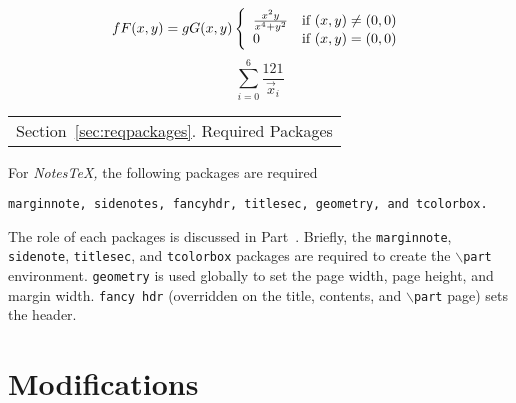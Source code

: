 \documentclass[10pt]{article}
\begin{document}
\[
f F (x,y)= gG(x,y) \left\{ \begin{array}{ll}
\frac{x^2y}{x^4+y^2} & \mbox{if $(x,y) \neq (0,0)$} \\
0 & \mbox{if $(x,y) = (0,0)$} \\
\end{array}
\right. \\
\]
\begin{equation}
\sum^{6}_{i=0}\frac{121}{\vec{x}_i}
\end{equation}

\begin{margintable}\vspace{.8in}\footnotesize
		\begin{tabularx}{\marginparwidth}{|X}
		Section~\ref{sec:reqpackages}. Required Packages\\
		\end{tabularx}
	\end{margintable}
	For \textit{NotesTeX,}  the following  packages are required
	\begin{center}
		\texttt{marginnote, sidenotes, fancyhdr, titlesec, geometry, and tcolorbox.}
	\end{center}
	The role of each packages is discussed in Part~\ref{Part:Modification}. Briefly, the \texttt{marginnote}, \texttt{sidenote}, \texttt{titlesec}, and \texttt{tcolorbox} packages are required to create the \texttt{$\backslash$part} environment. \texttt{geometry} is used globally to set the page width, page height, and margin width. \texttt{fancy\ hdr} (overridden on the title, contents, and \texttt{$\backslash$part} page) sets the header.

\part{Modifications}\label{Part:Modification}
\end{document}

